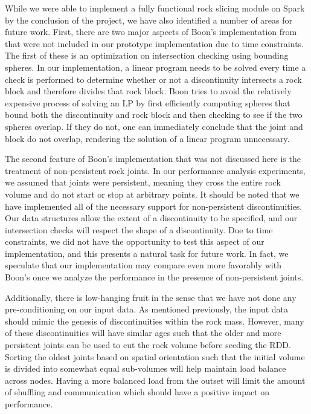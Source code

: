 While we were able to implement a fully functional rock slicing module on Spark by the conclusion of the project, we have also identified a number of areas for future work. First, there are two major aspects of Boon's implementation from \cite{slicing} that were not included in our prototype implementation due to time constraints. The first of these is an optimization on intersection checking using bounding spheres. In our implementation, a linear program needs to be solved every time a check is performed to determine whether or not a discontinuity intersects a rock block and therefore divides that rock block. Boon tries to avoid the relatively expensive process of solving an LP by first efficiently computing spheres that bound both the discontinuity and rock block and then checking to see if the two spheres overlap. If they do not, one can immediately conclude that the joint and block do not overlap, rendering the solution of a linear program unnecessary.

The second feature of Boon's implementation that was not discussed here is the treatment of non-persistent rock joints. In our performance analysis experiments, we assumed that joints were persistent, meaning they cross the entire rock volume and do not start or stop at arbitrary points. It should be noted that we have implemented all of the necessary support for non-persistent discontinuities. Our data structures allow the extent of a discontinuity to be specified, and our intersection checks will respect the shape of a discontinuity. Due to time constraints, we did not have the opportunity to test this aspect of our implementation, and this presents a natural task for future work. In fact, we speculate that our implementation may compare even more favorably with Boon's once we analyze the performance in the presence of non-persistent joints.

Additionally, there is low-hanging fruit in the sense that we have not done any pre-conditioning on our input data. As mentioned previously, the input data should mimic the genesis of discontinuities within the rock mass. However, many of these discontinuities will have similar ages such that the older and more persistent joints can be used to cut the rock volume before seeding the RDD. Sorting the oldest joints based on spatial orientation such that the initial volume is divided into somewhat equal sub-volumes will help maintain load balance across nodes. Having a more balanced load from the outset will limit the amount of shuffling and communication which should have a positive impact on performance.

